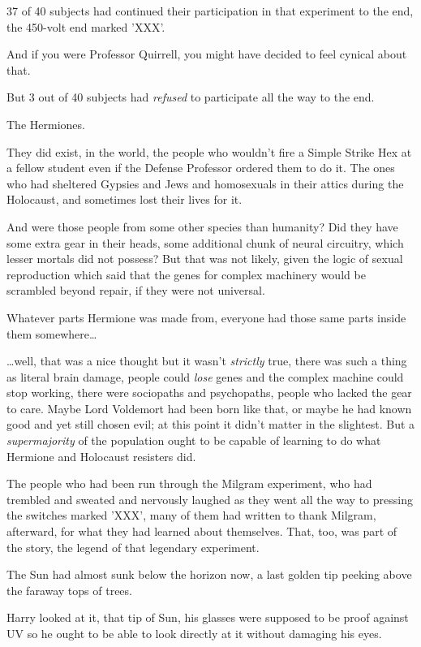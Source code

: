 37 of 40 subjects had continued their participation in that experiment to the 
end, the 450-volt end marked 'XXX'.

And if you were Professor Quirrell, you might have decided to feel cynical 
about that.

But 3 out of 40 subjects had \emph{refused} to participate all the way to the 
end.

The Hermiones.

They did exist, in the world, the people who wouldn't fire a Simple Strike Hex 
at a fellow student even if the Defense Professor ordered them to do it. The 
ones who had sheltered Gypsies and Jews and homosexuals in their attics during 
the Holocaust, and sometimes lost their lives for it.

And were those people from some other species than humanity? Did they have some 
extra gear in their heads, some additional chunk of neural circuitry, which 
lesser mortals did not possess? But that was not likely, given the logic of 
sexual reproduction which said that the genes for complex machinery would be 
scrambled beyond repair, if they were not universal.

Whatever parts Hermione was made from, everyone had those same parts inside 
them somewhere{\ldots}

{\ldots}well, that was a nice thought but it wasn't \emph{strictly} true, there 
was such a thing as literal brain damage, people could \emph{lose} genes and 
the complex machine could stop working, there were sociopaths and psychopaths, 
people who lacked the gear to care. Maybe Lord Voldemort had been born like 
that, or maybe he had known good and yet still chosen evil; at this point it 
didn't matter in the slightest. But a \emph{supermajority} of the population 
ought to be capable of learning to do what Hermione and Holocaust resisters did.

The people who had been run through the Milgram experiment, who had trembled 
and sweated and nervously laughed as they went all the way to pressing the 
switches marked 'XXX', many of them had written to thank Milgram, afterward, 
for what they had learned about themselves. That, too, was part of the story, 
the legend of that legendary experiment.

The Sun had almost sunk below the horizon now, a last golden tip peeking above 
the faraway tops of trees.

Harry looked at it, that tip of Sun, his glasses were supposed to be proof 
against UV so he ought to be able to look directly at it without damaging his 
eyes.

